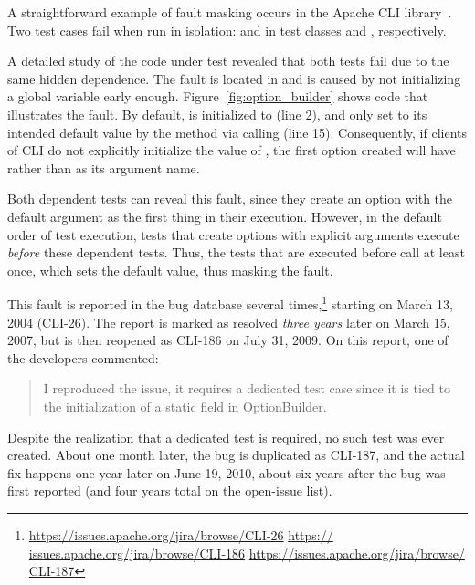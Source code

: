 A straightforward example of fault masking occurs in the Apache CLI
library~\cite{cli}.
Two test cases fail when run in isolation:
 and  in test
classes  and ,
respectively.

A detailed study of the code under test revealed that both 
tests fail due to the same hidden dependence. The fault is located in 
 and is caused by not initializing a global
variable early enough.
Figure~\ref{fig:option_builder} shows code that
illustrates the fault. 
%
By default,
 is initialized to  (line 2), and only set to
its intended default value  by the  method
via calling  (line 15). 
Consequently, if clients of CLI do not explicitly initialize the value of
, the first option created will have  rather
than  as its argument name.

Both dependent tests
can reveal this fault, since they create an option with 
the default argument as the first thing in their execution. However,
in the default order of test execution, 
tests that create options with explicit arguments execute \emph{before} 
these dependent tests.
Thus, the tests that are executed before call  at least once, which
sets the default  value, thus masking the fault.


This fault is reported in the bug
database several times,\footnote{\url{https://issues.apache.org/jira/browse/CLI-26} \url{https://
issues.apache.org/jira/browse/CLI-186} \url{https://issues.apache.org/jira/browse/
CLI-187}} starting on March 13, 2004 (CLI-26). The report is marked as resolved
\emph{three years} later on March 15, 2007, but is then reopened as CLI-186 on
July 31, 2009. On this report, one of the developers commented:
\begin{quote}
I reproduced the issue, it requires a dedicated test case since it is tied to the initialization 
of a static field in OptionBuilder.
\end{quote}
Despite the realization that a dedicated test is required, no such
test was ever created.
About one month later, the bug is duplicated as CLI-187, and the
actual fix happens one 
year later on June 19, 2010, about six years after the bug was first reported (and four years
total on the open-issue list).


